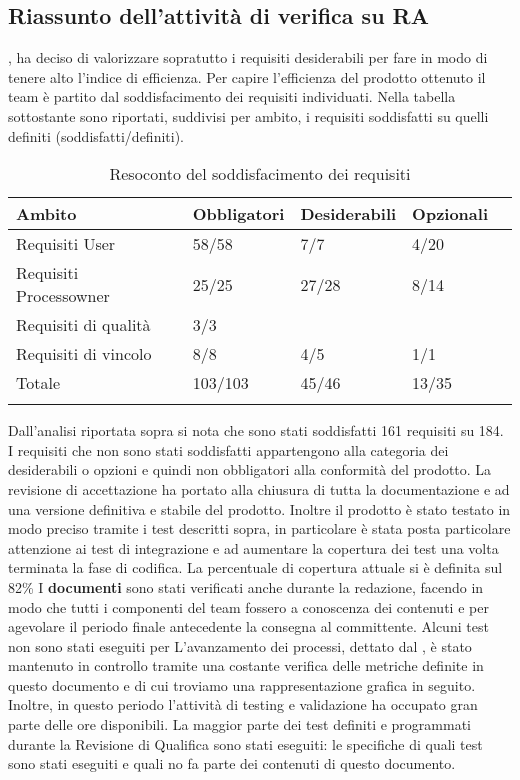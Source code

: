 \subsection{Riassunto dell'attività di verifica su RA} 
\gruppo, ha deciso di valorizzare sopratutto i requisiti desiderabili per fare in modo di tenere alto l'indice di efficienza.
Per capire l'efficienza del prodotto ottenuto il team è partito dal soddisfacimento dei requisiti individuati.
Nella tabella sottostante sono riportati, suddivisi per ambito, i requisiti soddisfatti su quelli definiti (soddisfatti/definiti).
\begin{longtable}{lllXr}
\toprule
\textbf{Ambito} & \textbf{Obbligatori} & \textbf{Desiderabili} & \textbf{Opzionali} \\
\toprule
Requisiti User & 58/58 & 7/7 & 4/20\\
\midrule
Requisiti Processowner & 25/25 & 27/28 & 8/14\\
\midrule
Requisiti di qualità & 3/3 &  & \\
\midrule
Requisiti di vincolo & 8/8 & 4/5 & 1/1\\
\midrule
Totale & 103/103 & 45/46 & 13/35\\
\bottomrule
\caption{Resoconto del soddisfacimento dei requisiti}
\end{longtable}
Dall'analisi riportata sopra si nota che sono stati soddisfatti 161 requisiti su 184. I requisiti che non sono stati soddisfatti appartengono alla categoria dei desiderabili o opzioni e quindi non obbligatori alla conformità del prodotto.
La revisione di accettazione ha portato alla chiusura di tutta la documentazione e ad una versione definitiva e stabile del prodotto. Inoltre il prodotto è stato testato in modo preciso tramite i test descritti sopra, in particolare è stata posta particolare attenzione ai test di integrazione e ad aumentare la copertura dei test una volta terminata la fase di codifica. La percentuale di copertura attuale si è definita sul 82\%
I \textbf{documenti} sono stati verificati anche durante la redazione, facendo in modo che tutti i componenti del team fossero a conoscenza dei contenuti e per agevolare il periodo finale antecedente la consegna al committente.
Alcuni test non sono stati eseguiti per 
L'avanzamento dei processi, dettato dal \infoPDP, è stato mantenuto in controllo tramite una costante verifica delle metriche definite in questo documento e di cui troviamo una rappresentazione grafica in seguito.
Inoltre, in questo periodo l'attività di testing e validazione ha occupato gran parte delle ore disponibili. La maggior parte dei test definiti e programmati durante la Revisione di Qualifica sono stati eseguiti: le specifiche di quali test sono stati eseguiti e quali no fa parte dei contenuti di questo documento.
